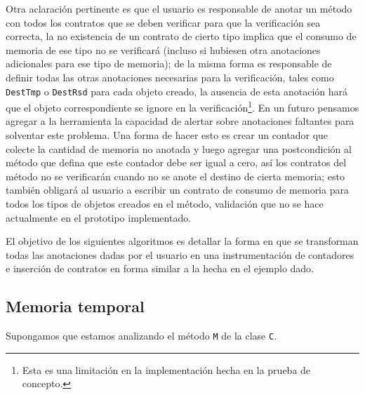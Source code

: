 \documentclass[12pt,a4paper]{article}
\newcommand\mono[1]{\texttt{#1}}
\begin{document}
			Otra aclaración pertinente es que el usuario es responsable de anotar un método con todos los contratos que se deben verificar para que la verificación sea correcta, la no existencia de un contrato de cierto tipo implica que el consumo de memoria de ese tipo no se verificará (incluso si hubiesen otra anotaciones adicionales para ese tipo de memoria); de la misma forma es responsable de definir todas las otras anotaciones necesarias para la verificación, tales como \mono{DestTmp} o \mono{DestRsd} para cada objeto creado, la ausencia de esta anotación hará que el objeto correspondiente se ignore en la verificación\footnote{Esta es una limitación en la implementación hecha en la prueba de concepto.}. En un futuro pensamos agregar a la herramienta la capacidad de alertar sobre anotaciones faltantes para solventar este problema. Una forma de hacer esto es crear un contador que colecte la cantidad de memoria no anotada y luego agregar una postcondición al método que defina que este contador debe ser igual a cero, así los contratos del método no se verificarán cuando no se anote el destino de cierta memoria; esto también obligará al usuario a escribir un contrato de consumo de memoria para todos los tipos de objetos creados en el método, validación que no se hace actualmente en el prototipo implementado.

			El objetivo de los siguientes algoritmos es detallar la forma en que se transforman todas las anotaciones dadas por el usuario en una instrumentación de contadores e inserción de contratos en forma similar a la hecha en el ejemplo dado.

		\subsection{Memoria temporal}
			Supongamos que estamos analizando el método \mono{M} de la clase \mono{C}.
\end{document}
